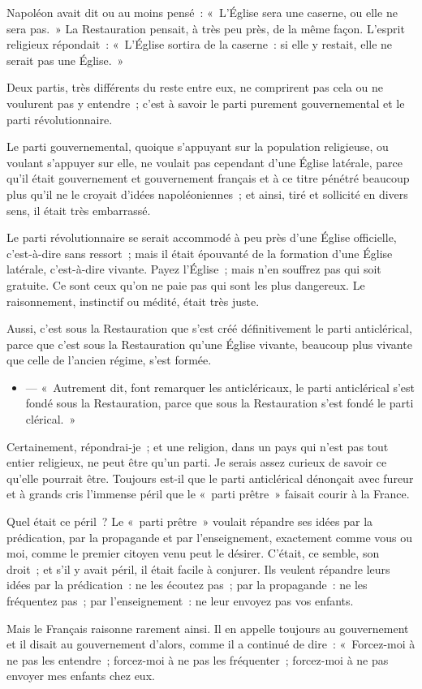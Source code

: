 \documentclass[french,twoside]{book} %
\begin{document}
Napoléon avait dit ou au moins pensé : « L’Église sera une caserne, ou elle ne sera pas. » La Restauration pensait, à très peu près, de la même façon. L’esprit religieux répondait : « L’Église sortira de la caserne : si elle y restait, elle ne serait pas une Église. »\par
Deux partis, très différents du reste entre eux, ne comprirent pas cela ou ne voulurent pas y entendre ; c’est à savoir le parti purement gouvernemental et le parti révolutionnaire.\par
Le parti gouvernemental, quoique s’appuyant  sur la population religieuse, ou voulant s’appuyer sur elle, ne voulait pas cependant d’une Église latérale, parce qu’il était gouvernement et gouvernement français et à ce titre pénétré beaucoup plus qu’il ne le croyait d’idées napoléoniennes ; et ainsi, tiré et sollicité en divers sens, il était très embarrassé.\par
Le parti révolutionnaire se serait accommodé à peu près d’une Église officielle, c’est-à-dire sans ressort ; mais il était épouvanté de la formation d’une Église latérale, c’est-à-dire vivante. Payez l’Église ; mais n’en souffrez pas qui soit gratuite. Ce sont ceux qu’on ne paie pas qui sont les plus dangereux. Le raisonnement, instinctif ou médité, était très juste.\par
Aussi, c’est sous la Restauration que s’est créé définitivement le parti anticlérical, parce que c’est sous la Restauration qu’une Église vivante, beaucoup plus vivante que celle de l’ancien régime, s’est formée.\par

\begin{itemize}[itemsep=0pt,]
\item  — « Autrement dit, font remarquer les anticléricaux, le parti anticlérical s’est fondé sous la Restauration, parce que sous la Restauration s’est fondé le parti clérical. »
\end{itemize}

\noindent Certainement, répondrai-je ; et une religion, dans un pays qui n’est pas tout entier religieux, ne peut être qu’un parti. Je serais assez curieux de savoir  ce qu’elle pourrait être. Toujours est-il que le parti anticlérical dénonçait avec fureur et à grands cris l’immense péril que le « parti prêtre » faisait courir à la France.\par
Quel était ce péril ? Le « parti prêtre » voulait répandre ses idées par la prédication, par la propagande et par l’enseignement, exactement comme vous ou moi, comme le premier citoyen venu peut le désirer. C’était, ce semble, son droit ; et s’il y avait péril, il était facile à conjurer. Ils veulent répandre leurs idées par la prédication : ne les écoutez pas ; par la propagande : ne les fréquentez pas ; par l’enseignement : ne leur envoyez pas vos enfants.\par
Mais le Français raisonne rarement ainsi. Il en appelle toujours au gouvernement et il disait au gouvernement d’alors, comme il a continué de dire : « Forcez-moi à ne pas les entendre ; forcez-moi à ne pas les fréquenter ; forcez-moi à ne pas envoyer mes enfants chez eux.\par
\end{document}
